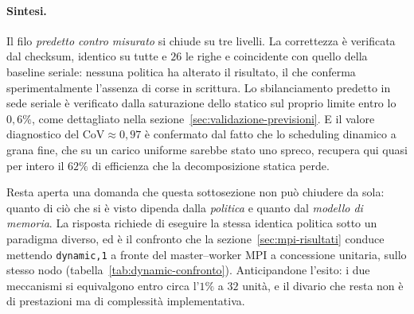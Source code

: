 \paragraph{Sintesi.}
Il filo \emph{predetto contro misurato} si chiude su tre livelli. La correttezza
è verificata dal checksum, identico su tutte e $26$ le righe e coincidente con
quello della baseline seriale: nessuna politica ha alterato il risultato, il che
conferma sperimentalmente l'assenza di corse in scrittura. Lo sbilanciamento
predetto in sede seriale è verificato dalla saturazione dello statico sul
proprio limite entro lo $0{,}6\%$, come dettagliato nella
sezione~\ref{sec:validazione-previsioni}. E il valore diagnostico del
$\mathrm{CoV} \approx 0{,}97$ è confermato dal fatto che lo scheduling dinamico
a grana fine, che su un carico uniforme sarebbe stato uno spreco, recupera qui
quasi per intero il $62\%$ di efficienza che la decomposizione statica perde.

Resta aperta una domanda che questa sottosezione non può chiudere da sola:
quanto di ciò che si è visto dipenda dalla \emph{politica} e quanto dal
\emph{modello di memoria}. La risposta richiede di eseguire la stessa identica
politica sotto un paradigma diverso, ed è il confronto che la
sezione~\ref{sec:mpi-risultati} conduce mettendo \texttt{dynamic,1} a fronte del
master--worker MPI a concessione unitaria, sullo stesso nodo
(tabella~\ref{tab:dynamic-confronto}). Anticipandone l'esito: i due meccanismi si
equivalgono entro circa l'$1\%$ a $32$ unità, e il divario che
resta non è di prestazioni ma di complessità implementativa.